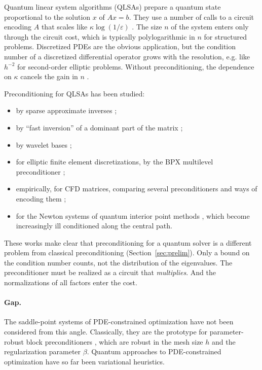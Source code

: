 \documentclass[11pt,a4paper]{article}
\theoremstyle{remark}
\begin{document}
Quantum linear system algorithms (QLSAs) prepare a quantum state proportional
to the solution $x$ of $Ax=b$. They use a number of calls to a circuit
encoding $A$ that scales like $\kappa\log(1/\varepsilon)$ \cite{CKS17,GSLW19,Costa22}. The
size $n$ of the system enters only through the circuit cost, which is
typically polylogarithmic in $n$ for structured problems. Discretized PDEs are
the obvious application, but the condition number of a discretized
differential operator grows with the resolution, e.g. like $h^{-2}$ for
second-order elliptic problems. Without preconditioning, the dependence on
$\kappa$ cancels the gain in $n$ \cite{MP16,LMS22}.

Preconditioning for QLSAs has been studied:
\begin{itemize}
\item by sparse approximate inverses \cite{CJS13};
\item by ``fast inversion'' of a dominant part of the matrix \cite{TAWL21};
\item by wavelet bases \cite{BNWA23};
\item for elliptic finite element discretizations, by the BPX multilevel
  preconditioner \cite{DP24};
\item empirically, for CFD matrices, comparing several preconditioners and
  ways of encoding them \cite{LS25};
\item for the Newton systems of quantum interior point methods
  \cite{QIPMreview}, which become increasingly ill conditioned along the
  central path.
\end{itemize}
These works make clear that preconditioning for a quantum solver is a
different problem from classical preconditioning
(Section~\ref{sec:prelim}). Only a bound on the condition number counts,
not the distribution of the eigenvalues. The preconditioner must be
realized as a circuit that \emph{multiplies}. And the normalizations of
all factors enter the cost.

\paragraph{Gap.} The saddle-point systems of PDE-constrained optimization
have not been considered from this angle. Classically, they are the
prototype for parameter-robust block preconditioners
\cite{RDW10,SZ07,PW12}, which are robust in the mesh size $h$ and the
regularization parameter $\beta$. Quantum approaches to PDE-constrained
optimization have so far been variational heuristics.
\end{document}
